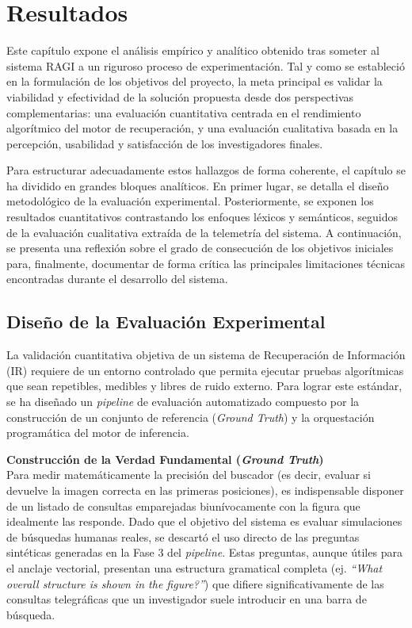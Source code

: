 \documentclass[a4paper]{report}
\newcommand{\sectionbreak}{\clearpage}
\begin{document}
\chapter{Resultados}

Este capítulo expone el análisis empírico y analítico obtenido tras someter al sistema RAGI a un riguroso proceso de experimentación. Tal y como se estableció en la formulación de los objetivos del proyecto, la meta principal es validar la viabilidad y efectividad de la solución propuesta desde dos perspectivas complementarias: una evaluación cuantitativa centrada en el rendimiento algorítmico del motor de recuperación, y una evaluación cualitativa basada en la percepción, usabilidad y satisfacción de los investigadores finales.

Para estructurar adecuadamente estos hallazgos de forma coherente, el capítulo se ha dividido en grandes bloques analíticos. En primer lugar, se detalla el diseño metodológico de la evaluación experimental. Posteriormente, se exponen los resultados cuantitativos contrastando los enfoques léxicos y semánticos, seguidos de la evaluación cualitativa extraída de la telemetría del sistema. A continuación, se presenta una reflexión sobre el grado de consecución de los objetivos iniciales para, finalmente, documentar de forma crítica las principales limitaciones técnicas encontradas durante el desarrollo del sistema.

\renewcommand{\sectionbreak}{}

\section{Diseño de la Evaluación Experimental}
\label{sec:resultados_evaluacion}

\renewcommand{\sectionbreak}{\clearpage}

La validación cuantitativa objetiva de un sistema de Recuperación de Información (IR) requiere de un entorno controlado que permita ejecutar pruebas algorítmicas que sean repetibles, medibles y libres de ruido externo. Para lograr este estándar, se ha diseñado un \textit{pipeline} de evaluación automatizado compuesto por la construcción de un conjunto de referencia (\textit{Ground Truth}) y la orquestación programática del motor de inferencia.

\textbf{Construcción de la Verdad Fundamental (\textit{Ground Truth})}\\
Para medir matemáticamente la precisión del buscador (es decir, evaluar si devuelve la imagen correcta en las primeras posiciones), es indispensable disponer de un listado de consultas emparejadas biunívocamente con la figura que idealmente las responde. Dado que el objetivo del sistema es evaluar simulaciones de búsquedas humanas reales, se descartó el uso directo de las preguntas sintéticas generadas en la Fase 3 del \textit{pipeline}. Estas preguntas, aunque útiles para el anclaje vectorial, presentan una estructura gramatical completa (ej. \textit{``What overall structure is shown in the figure?''}) que difiere significativamente de las consultas telegráficas que un investigador suele introducir en una barra de búsqueda.
\end{document}

